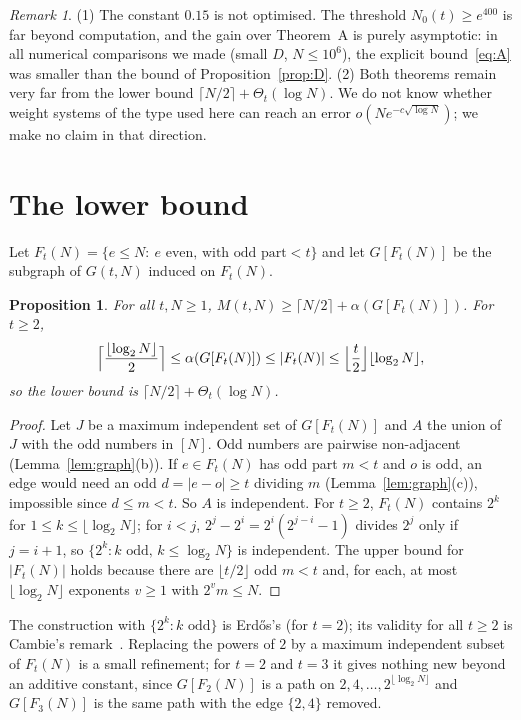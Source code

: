 \documentclass[11pt]{amsart}
\newtheorem{proposition}[lemma]{Proposition}
\theoremstyle{definition}
\theoremstyle{remark}
\newtheorem{remark}[lemma]{Remark}
\begin{document}
\begin{remark}
(1) The constant $0.15$ is not optimised. The threshold $N_0(t)\ge e^{400}$ is far beyond computation, and the gain over Theorem~A is purely asymptotic: in all numerical comparisons we made (small $D$, $N\le10^6$), the explicit bound~\eqref{eq:A} was smaller than the bound of Proposition~\ref{prop:D}. (2) Both theorems remain very far from the lower bound $\lceil N/2\rceil+\Theta_t(\log N)$. We do not know whether weight systems of the type used here can reach an error $o(N e^{-c\sqrt{\log N}})$; we make no claim in that direction.
\end{remark}

\section{The lower bound}\label{sec:lower}

Let $F_t(N)=\{e\le N:\ e\text{ even, with odd part}<t\}$ and let $G[F_t(N)]$ be the subgraph of $G(t,N)$ induced on $F_t(N)$.

\begin{proposition}\label{prop:lower}
For all $t,N\ge1$, $M(t,N)\ge\lceil N/2\rceil+\alpha(G[F_t(N)])$. For $t\ge2$,
\[
\Bigl\lceil\frac{\lfloor\log_2N\rfloor}{2}\Bigr\rceil\le\alpha(G[F_t(N)])\le|F_t(N)|\le\Bigl\lfloor\frac t2\Bigr\rfloor\lfloor\log_2N\rfloor,
\]
so the lower bound is $\lceil N/2\rceil+\Theta_t(\log N)$.
\end{proposition}

\begin{proof}
Let $J$ be a maximum independent set of $G[F_t(N)]$ and $A$ the union of $J$ with the odd numbers in $[N]$. Odd numbers are pairwise non-adjacent (Lemma~\ref{lem:graph}(b)). If $e\in F_t(N)$ has odd part $m<t$ and $o$ is odd, an edge would need an odd $d=|e-o|\ge t$ dividing $m$ (Lemma~\ref{lem:graph}(c)), impossible since $d\le m<t$. So $A$ is independent. For $t\ge2$, $F_t(N)$ contains $2^k$ for $1\le k\le\lfloor\log_2N\rfloor$; for $i<j$, $2^j-2^i=2^i(2^{j-i}-1)$ divides $2^j$ only if $j=i+1$, so $\{2^k:k\text{ odd},\,k\le\log_2N\}$ is independent. The upper bound for $|F_t(N)|$ holds because there are $\lfloor t/2\rfloor$ odd $m<t$ and, for each, at most $\lfloor\log_2N\rfloor$ exponents $v\ge1$ with $2^vm\le N$.
\end{proof}

The construction with $\{2^k:k\text{ odd}\}$ is Erd\H{o}s's (for $t=2$); its validity for all $t\ge2$ is Cambie's remark~\cite{Forum}. Replacing the powers of $2$ by a maximum independent subset of $F_t(N)$ is a small refinement; for $t=2$ and $t=3$ it gives nothing new beyond an additive constant, since $G[F_2(N)]$ is a path on $2,4,\dots,2^{\lfloor\log_2N\rfloor}$ and $G[F_3(N)]$ is the same path with the edge $\{2,4\}$ removed.
\end{document}
